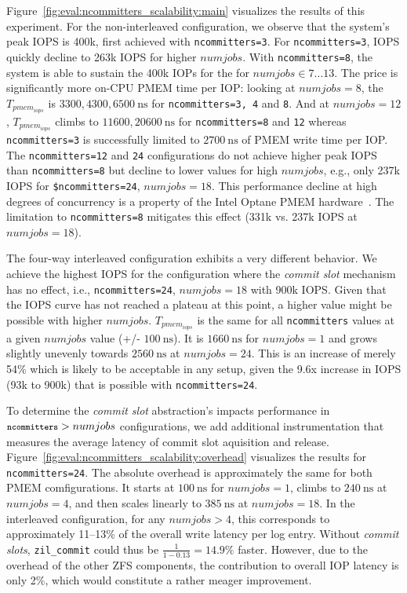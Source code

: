 \documentclass[12pt,a4paper,twoside]{book}
\begin{document}
Figure~\ref{fig:eval:ncommitters_scalability:main} visualizes the results of this experiment.
For the non-interleaved configuration, we observe that the system's peak IOPS is 400k, first achieved with \lstinline{ncommitters=3}.
For \lstinline{ncommitters=3}, IOPS quickly decline to 263k IOPS for higher $numjobs$.
With \lstinline{ncommitters=8}, the system is able to sustain the 400k IOPs for the for $numjobs \in 7 \dots 13$.
The price is significantly more on-CPU PMEM time per IOP:
looking at $numjobs = 8$, the $T_{pmem_{iops}}$ is $3300, 4300, 6500~\text{ns}$ for \lstinline{ncommitters=3, 4} and \lstinline{8}.
And at $numjobs = 12$, $T_{pmem_{iops}}$ climbs to $11600, 20600~\text{ns}$ for \lstinline{ncommitters=8} and \lstinline{12} whereas \lstinline{ncommitters=3} is successfully limited to $2700~\text{ns}$ of PMEM write time per IOP.
The \lstinline{ncommitters=12} and \lstinline{24} configurations do not achieve higher peak IOPS than \lstinline{ncommitters=8} but decline to lower values for high $numjobs$, e.g., only 237k IOPS for \lstinline{$ncommitters=24}, $numjobs = 18$.
This performance decline at high degrees of concurrency is a property of the Intel Optane PMEM hardware~\cite{yangEmpiricalGuideBehavior2020}.
The limitation to \lstinline{ncommitters=8} mitigates this effect (331k vs. 237k IOPS at $numjobs = 18$).

The four-way interleaved configuration exhibits a very different behavior.
We achieve the highest IOPS for the configuration where the \textit{commit slot} mechanism has no effect, i.e., \lstinline{ncommitters=24}, $numjobs = 18$ with 900k IOPS.
Given that the IOPS curve has not reached a plateau at this point, a higher value might be possible with higher $numjobs$.
$T_{pmem_{iops}}$ is the same for all \lstinline{ncommitters} values at a given $numjobs$ value (+/- $100~\text{ns}$).
It is $1660~\text{ns}$ for $numjobs = 1$ and grows slightly unevenly towards $2560~\text{ns}$ at $numjobs = 24$.
This is an increase of merely 54\% which is likely to be acceptable in any setup, given the 9.6x increase in IOPS (93k to 900k) that is possible with \lstinline{ncommitters=24}.

To determine the \textit{commit slot} abstraction's impacts performance in ${\footnotesize\texttt{ncommitters}} > numjobs$ configurations, we add additional instrumentation that measures the average latency of commit slot aquisition and release.
Figure~\ref{fig:eval:ncommitters_scalability:overhead} visualizes the results for \lstinline{ncommitters=24}.
The absolute overhead is approximately the same for both PMEM comfigurations.
It starts at $100~\text{ns}$ for $numjobs = 1$, climbs to $240~\text{ns}$ at $numjobs = 4$, and then scales linearly to $385~\text{ns}$ at $numjobs = 18$.
In the interleaved configuration, for any $numjobs > 4$, this corresponds to approximately 11--13\% of the overall write latency per log entry.
Without \textit{commit slots}, \lstinline{zil_commit} could thus be $\frac{1}{1 - 0.13} = 14.9\%$ faster.
However, due to the overhead of the other ZFS components, the contribution to overall IOP latency is only 2\%, which would constitute a rather meager improvement.
\end{document}
